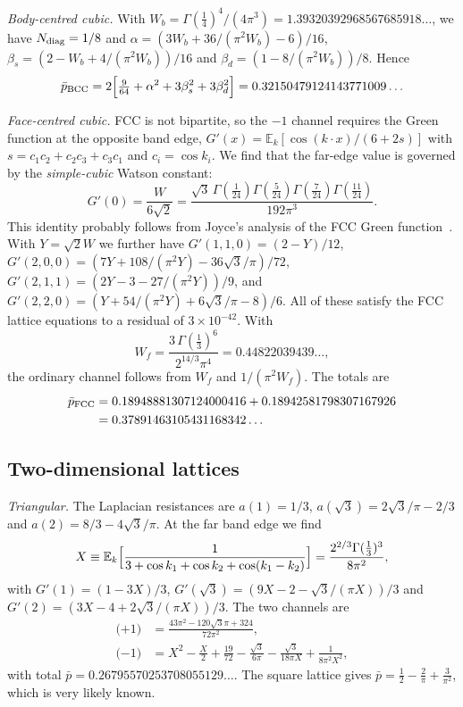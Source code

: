 \documentclass[aps,pra,10pt,twocolumn,superscriptaddress,nofootinbib]{revtex4-2}
\newcommand{\E}{\mathbb{E}}
\newcommand{\pbar}{\bar{p}}
\newcommand{\sq}{\sqrt{3}}
\begin{document}
\emph{Body-centred cubic.} With $W_b=\Gamma(\tfrac14)^4/(4\pi^3)=1.39320392968567685918\ldots$,
we have $N_{\rm diag}=1/8$ and
$\alpha=(3W_b+36/(\pi^2W_b)-6)/16$,
$\beta_s=(2-W_b+4/(\pi^2W_b))/16$ and
$\beta_d=(1-8/(\pi^2W_b))/8$. Hence
\begin{equation}
\pbar_{\rm BCC}=2\Bigl[\tfrac9{64}+\alpha^2+3\beta_s^2+3\beta_d^2\Bigr]
=0.32150479124143771009\ldots
\end{equation}

\emph{Face-centred cubic.} FCC is not bipartite, so the $-1$ channel requires the
Green function at the opposite band edge, $G'(x)=\E_k[\cos(k\cdot x)/(6+2s)]$ with
$s=c_1c_2+c_2c_3+c_3c_1$ and $c_i=\cos k_i$. We find that the far-edge value is governed by
the \emph{simple-cubic} Watson constant:
\begin{equation}
G'(0)=\frac{W}{6\sqrt2}
=\frac{\sq\,\Gamma(\tfrac1{24})\Gamma(\tfrac5{24})\Gamma(\tfrac7{24})\Gamma(\tfrac{11}{24})}{192\pi^3}.
\label{eq:fcc-far}
\end{equation}
This identity probably follows from Joyce's analysis of the FCC Green
function~\cite{Joyce1998}. With $Y=\sqrt2W$ we further have $G'(1,1,0)=(2-Y)/12$,
$G'(2,0,0)=(7Y+108/(\pi^2Y)-36\sq/\pi)/72$,
$G'(2,1,1)=(2Y-3-27/(\pi^2Y))/9$, and
$G'(2,2,0)=(Y+54/(\pi^2Y)+6\sq/\pi-8)/6$. All of these satisfy the FCC lattice equations to a residual of
$3\times10^{-42}$. With
\begin{equation}
W_f=\frac{3\,\Gamma(\tfrac13)^6}{2^{14/3}\pi^4}=0.44822039439\ldots,
\end{equation}
the ordinary channel follows from $W_f$ and $1/(\pi^2W_f)$. The totals are
\begin{align}
\pbar_{\rm FCC}&=0.18948881307124000416+0.18942581798307167926\nonumber\\
&=0.37891463105431168342\ldots
\end{align}

\subsection{Two-dimensional lattices}

\emph{Triangular.} The Laplacian resistances are
$a(1)=1/3$, $a(\sq)=2\sq/\pi-2/3$ and $a(2)=8/3-4\sq/\pi$. At the far band edge we find
\begin{equation}
X\equiv\E_k\Bigl[\frac1{3+\cos k_1+\cos k_2+\cos(k_1-k_2)}\Bigr]
=\frac{2^{2/3}\Gamma(\tfrac13)^3}{8\pi^2},
\end{equation}
with $G'(1)=(1-3X)/3$, $G'(\sq)=(9X-2-\sq/(\pi X))/3$ and $G'(2)=(3X-4+2\sq/(\pi X))/3$. The two channels are
\begin{align}
\text{(+1)}&=\frac{43\pi^2-120\sq\pi+324}{72\pi^2},\\
\text{($-$1)}&=X^2-\frac X2+\frac{19}{72}-\frac{\sq}{6\pi}-\frac{\sq}{18\pi X}+\frac1{8\pi^2X^2},
\end{align}
with total $\pbar=0.26795570253708055129\ldots$.
The square lattice gives $\pbar=\tfrac12-\tfrac2\pi+\tfrac3{\pi^2}$, which is very likely known.
\end{document}
